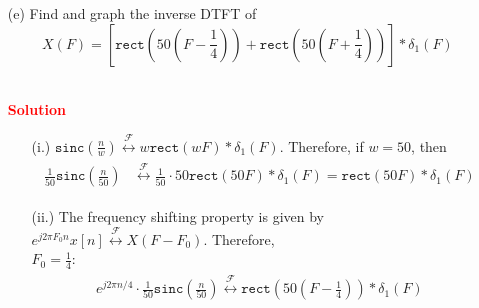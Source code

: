 \documentclass[a4paper, 12pt]{article}
\begin{document}
\begin{itemize}
\begin{itemize}
\pagebreak
\item[(e)]{Find and graph the inverse DTFT of}
\begin{equation}
X(F) = \left[\mathtt{rect}\left(50\left( F-\frac{1}{4}\right) \right) + \mathtt{rect}\left(50\left( F+\frac{1}{4}\right) \right)\right]*\delta_{1}(F)
\end{equation}
\begin{figure}[h!]
\end{figure} \\
\textcolor{red}{\textbf{Solution}}
\begin{itemize}
\item[(i.)]{$\mathtt{sinc}\left(\frac{n}{w} \right) \overset{\mathcal{F}}{\leftrightarrow} w\mathtt{rect}\left(wF \right) * \delta_{1}(F)$. Therefore, if $w=50$, then}
\begin{equation}
\begin{gathered}
\begin{alignedat}{1}
\frac{1}{50} \mathtt{sinc} \left(\frac{n}{50} \right) &\overset{\mathcal{F}}{\leftrightarrow} \frac{1}{50} \cdot 50 \mathtt{rect} \left(50F \right)*\delta_{1}(F) = \mathtt{rect}(50F)*\delta_{1}(F)
\end{alignedat}
\end{gathered}
\end{equation}
\item[(ii.)]{The frequency shifting property is given by $e^{j2\pi F_{0} n} x[n] \overset{\mathcal{F}}{\leftrightarrow} X(F - F_{0})$. Therefore,}\\
$F_{0} = \frac{1}{4}$:
\begin{equation}
\begin{gathered}
\begin{alignedat}{1}
e^{j2\pi n/4} \cdot \frac{1}{50} \mathtt{sinc} \left(\frac{n}{50} \right) \overset{\mathcal{F}}{\leftrightarrow} \mathtt{rect}\left(50\left(F - \frac{1}{4}\right)\right)*\delta_{1}(F)

\end{alignedat}
\end{gathered}
\end{equation}
\end{itemize}
\end{itemize}
\end{itemize}
\end{document}
